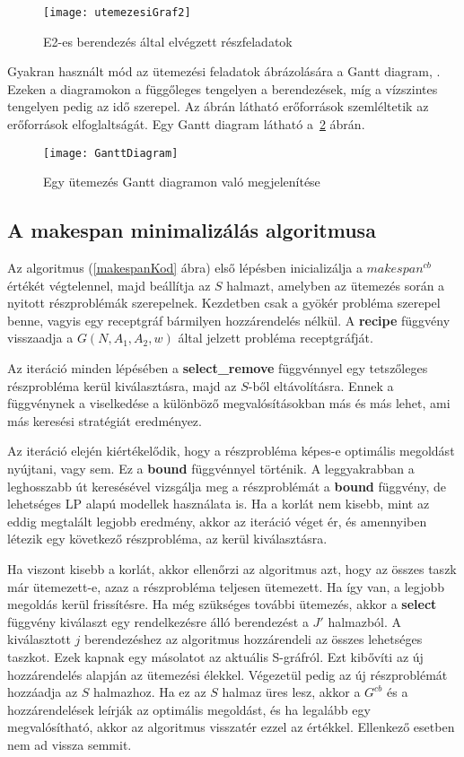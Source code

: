 \begin{figure}[H]
\begin{center}
\texttt{[image: utemezesiGraf2]}
\caption{E2-es berendezés által elvégzett részfeladatok}
\label{utemezesiGraf2}
\end{center}
\end{figure}
Gyakran használt mód az ütemezési feladatok ábrázolására a Gantt diagram\cite{ganttwwf}, \cite{ganttofw}. Ezeken a diagramokon a függőleges tengelyen a berendezések, míg a vízszintes tengelyen pedig az idő szerepel. Az ábrán látható erőforrások szemléltetik az erőforrások elfoglaltságát. Egy Gantt diagram látható a~\ref{GanttDiagram} ábrán.
\begin{figure}[H]
\begin{center}
\texttt{[image: GanttDiagram]}
\caption{Egy ütemezés Gantt diagramon való megjelenítése}
\label{GanttDiagram}
\end{center}
\end{figure}

\subsection{A makespan minimalizálás algoritmusa}
Az algoritmus (\ref{makespanKod} ábra) első lépésben inicializálja a $makespan^{cb}$ értékét végtelennel, majd beállítja az $S$ halmazt, amelyben az ütemezés során a nyitott részproblémák szerepelnek. Kezdetben csak a gyökér probléma szerepel benne, vagyis egy receptgráf bármilyen hozzárendelés nélkül. A \textbf{recipe} függvény visszaadja a $G(N,A_1,A_2,w)$ által jelzett probléma receptgráfját.

Az iteráció minden lépésében a \textbf{select\_remove} függvénnyel egy tetszőleges részprobléma kerül kiválasztásra, majd az $S$-ből eltávolításra. Ennek a függvénynek a viselkedése a különböző megvalósításokban más és más lehet, ami más keresési stratégiát eredményez.

Az iteráció elején kiértékelődik, hogy a részprobléma képes-e optimális megoldást nyújtani, vagy sem. Ez a \textbf{bound} függvénnyel történik. A leggyakrabban a leghosszabb út keresésével vizsgálja meg a részproblémát a \textbf{bound} függvény, de lehetséges LP alapú modellek használata is. Ha a korlát nem kisebb, mint az eddig megtalált legjobb eredmény, akkor az iteráció véget ér, és amennyiben létezik egy következő részprobléma, az kerül kiválasztásra. 

Ha viszont kisebb a korlát, akkor ellenőrzi az algoritmus azt, hogy az összes taszk már ütemezett-e, azaz a részprobléma teljesen ütemezett. Ha így van, a legjobb megoldás kerül frissítésre. Ha még szükséges további ütemezés, akkor a  \textbf{select} függvény kiválaszt egy rendelkezésre álló berendezést a $J'$ halmazból. A kiválasztott $j$ berendezéshez az algoritmus hozzárendeli az összes lehetséges taszkot. Ezek kapnak egy másolatot az aktuális S-gráfról. Ezt kibővíti az új hozzárendelés alapján az ütemezési élekkel. Végezetül pedig az új részproblémát hozzáadja az $S$ halmazhoz. Ha ez az $S$ halmaz üres lesz, akkor a $G^{cb}$ és a hozzárendelések leírják az optimális megoldást, és ha legalább egy megvalósítható, akkor az algoritmus visszatér ezzel az értékkel. Ellenkező esetben nem ad vissza semmit.


